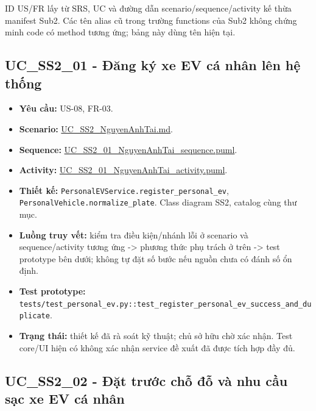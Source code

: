 \documentclass[11pt,a4paper]{article}
\providecommand{\tightlist}{%
  \setlength{\itemsep}{0pt}\setlength{\parskip}{0pt}}
\begin{document}
ID US/FR lấy từ SRS, UC và đường dẫn scenario/sequence/activity kế thừa
manifest Sub2. Các tên alias cũ trong trường functions của Sub2 không
chứng minh code có method tương ứng; bảng này dùng tên hiện tại.

\hypertarget{uc_ss2_01---ux111ux103ng-kuxfd-xe-ev-cuxe1-nhuxe2n-luxean-hux1ec7-thux1ed1ng}{%
\subsection{UC\_SS2\_01 - Đăng ký xe EV cá nhân lên hệ
thống}\label{uc_ss2_01---ux111ux103ng-kuxfd-xe-ev-cuxe1-nhuxe2n-luxean-hux1ec7-thux1ed1ng}}

\begin{itemize}
\tightlist
\item
  \textbf{Yêu cầu:} US-08, FR-03.
\item
  \textbf{Scenario:}
  \href{../../../../docs/diagrams/Use-case\%20detail-scenario/SS2/Usecase\%20scenario/UC_SS2_NguyenAnhTai.md}{UC\_SS2\_NguyenAnhTai.md}.
\item
  \textbf{Sequence:}
  \href{../../../../docs/diagrams/Use-case\%20detail-scenario/SS2/Sequence\%20diagrams/UC_SS2_01_NguyenAnhTai_sequence.puml}{UC\_SS2\_01\_NguyenAnhTai\_sequence.puml}.
\item
  \textbf{Activity:}
  \href{../../../../docs/diagrams/Use-case\%20detail-scenario/SS2/Activity\%20diagrams/UC_SS2_01_NguyenAnhTai_activity.puml}{UC\_SS2\_01\_NguyenAnhTai\_activity.puml}.
\item
  \textbf{Thiết kế:} \texttt{PersonalEVService.register\_personal\_ev},
  \texttt{PersonalVehicle.normalize\_plate}. Class diagram SS2, catalog
  cùng thư mục.
\item
  \textbf{Luồng truy vết:} kiểm tra điều kiện/nhánh lỗi ở scenario và
  sequence/activity tương ứng -\textgreater{} phương thức phụ trách ở
  trên -\textgreater{} test prototype bên dưới; không tự đặt số bước nếu
  nguồn chưa có đánh số ổn định.
\item
  \textbf{Test prototype:}
  \texttt{tests/test\_personal\_ev.py::test\_register\_personal\_ev\_success\_and\_duplicate}.
\item
  \textbf{Trạng thái:} thiết kế đã rà soát kỹ thuật; chủ sở hữu chờ xác
  nhận. Test core/UI hiện có không xác nhận service đề xuất đã được tích
  hợp đầy đủ.
\end{itemize}

\hypertarget{uc_ss2_02---ux111ux1eb7t-trux1b0ux1edbc-chux1ed7-ux111ux1ed7-vuxe0-nhu-cux1ea7u-sux1ea1c-xe-ev-cuxe1-nhuxe2n}{%
\subsection{UC\_SS2\_02 - Đặt trước chỗ đỗ và nhu cầu sạc xe EV cá
nhân}\label{uc_ss2_02---ux111ux1eb7t-trux1b0ux1edbc-chux1ed7-ux111ux1ed7-vuxe0-nhu-cux1ea7u-sux1ea1c-xe-ev-cuxe1-nhuxe2n}}
\end{document}
